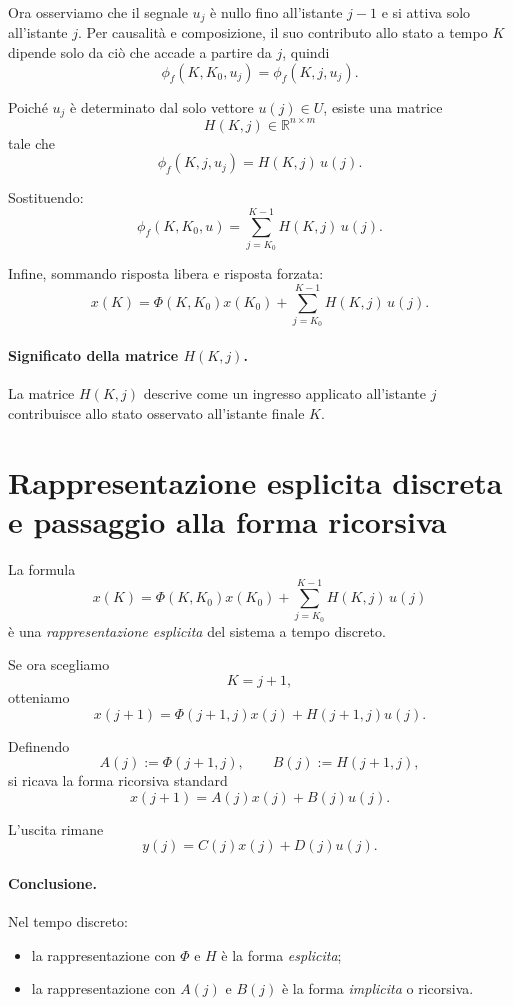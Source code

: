 Ora osserviamo che il segnale $u_j$ è nullo fino all'istante $j-1$ e si attiva solo all'istante $j$.  
Per causalità e composizione, il suo contributo allo stato a tempo $K$ dipende solo da ciò che accade a partire da $j$, quindi
\[
\phi_f(K,K_0,u_j)=\phi_f(K,j,u_j).
\]

Poiché $u_j$ è determinato dal solo vettore $u(j)\in U$, esiste una matrice
\[
H(K,j)\in\mathbb{R}^{n\times m}
\]
tale che
\[
\phi_f(K,j,u_j)=H(K,j)\,u(j).
\]

Sostituendo:
\[
\phi_f(K,K_0,u)=\sum_{j=K_0}^{K-1}H(K,j)\,u(j).
\]

Infine, sommando risposta libera e risposta forzata:
\[
x(K)=\Phi(K,K_0)x(K_0)+\sum_{j=K_0}^{K-1}H(K,j)\,u(j).
\]

\paragraph{Significato della matrice $H(K,j)$.}
La matrice $H(K,j)$ descrive come un ingresso applicato all'istante $j$ contribuisce allo stato osservato all'istante finale $K$.

\section{Rappresentazione esplicita discreta e passaggio alla forma ricorsiva}

La formula
\[
x(K)=\Phi(K,K_0)x(K_0)+\sum_{j=K_0}^{K-1}H(K,j)\,u(j)
\]
è una \emph{rappresentazione esplicita} del sistema a tempo discreto.

Se ora scegliamo
\[
K=j+1,
\]
otteniamo
\[
x(j+1)=\Phi(j+1,j)x(j)+H(j+1,j)u(j).
\]

Definendo
\[
A(j):=\Phi(j+1,j),
\qquad
B(j):=H(j+1,j),
\]
si ricava la forma ricorsiva standard
\begin{equation}
x(j+1)=A(j)x(j)+B(j)u(j).
\label{eq:L3_TD_implicit}
\end{equation}

L'uscita rimane
\begin{equation}
y(j)=C(j)x(j)+D(j)u(j).
\label{eq:L3_TD_output_local}
\end{equation}

\paragraph{Conclusione.}
Nel tempo discreto:
\begin{itemize}
    \item la rappresentazione con $\Phi$ e $H$ è la forma \emph{esplicita};
    \item la rappresentazione con $A(j)$ e $B(j)$ è la forma \emph{implicita} o ricorsiva.
\end{itemize}

